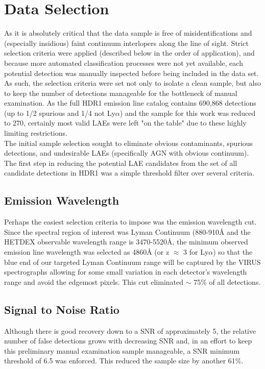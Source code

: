\documentclass{aastex62}
\begin{document}
\section{Data Selection} \label{sec:selection}

As it is absolutely critical that the data sample is free of misidentifications and (especially insidious) faint continuum interlopers along the line of sight. Strict selection criteria were applied (described below in the order of application), and because more automated classification processes were not yet available, each potential detection was manually inspected before being included in the data set. As such, the selection criteria were set not only to isolate a clean sample, but also to keep the number of detections manageable for the bottleneck of manual examination. As the full HDR1 emission line catalog contains 690,868 detections (up to 1/2 spurious and 1/4 not Ly$\alpha$) and the sample for this work was reduced to 270, certainly most valid LAEs were left "on the table" due to these highly limiting restrictions. \\

The initial sample selection sought to eliminate obvious contaminants, spurious detections, and undesirable LAEs (specifically AGN with obvious continuum). The first step in reducing the potential LAE candidates from the set of all candidate detections in HDR1 was a simple threshold filter over several criteria. \\

\subsection{Emission Wavelength}
Perhaps the easiest selection criteria to impose was the emission wavelength cut. Since the spectral region of interest was Lyman Continuum (880-910$\mbox{\AA}$ and the HETDEX observable wavelength range is 3470-5520$\mbox{\AA}$, the minimum observed emission line wavelength was selected as 4860$\mbox{\AA}$ (or z $\approx$ 3 for Ly$\alpha$) so that the blue end of our targeted Lyman Continuum range will be captured by the VIRUS spectrographs allowing for some small variation in each detector's wavelength range and avoid the edgemost pixels. This cut eliminated $\sim$ 75\% of all detections.\\

\subsection{Signal to Noise Ratio}
Although there is good recovery down to a SNR of approximately 5, the relative number of false detections grows with decreasing SNR and, in an effort to keep this preliminary manual examination sample manageable, a SNR minimum threshold of 6.5 was enforced. This reduced the sample size by another 61\%.\\
\end{document}
